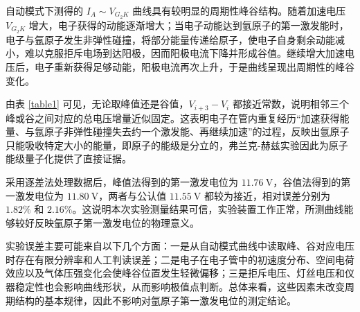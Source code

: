 \documentclass{../template/myrpt}
\begin{document}
自动模式下测得的 $I_A \sim V_{G_2K}$ 曲线具有较明显的周期性峰谷结构。随着加速电压 $V_{G_2K}$ 增大，电子获得的动能逐渐增大；当电子动能达到氩原子的第一激发能时，电子与氩原子发生非弹性碰撞，将部分能量传递给原子，使电子自身剩余动能减小，难以克服拒斥电场到达阳极，因而阳极电流下降并形成谷值。继续增大加速电压后，电子重新获得足够动能，阳极电流再次上升，于是曲线呈现出周期性的峰谷变化。

由表 \ref{table1} 可见，无论取峰值还是谷值，$V_{i+3}-V_i$ 都接近常数，说明相邻三个峰或谷之间对应的总电压增量近似固定。这表明电子在管内重复经历“加速获得能量、与氩原子非弹性碰撞失去约一个激发能、再继续加速”的过程，反映出氩原子只能吸收特定大小的能量，即原子的能级是分立的，弗兰克-赫兹实验因此为原子能级量子化提供了直接证据。

采用逐差法处理数据后，峰值法得到的第一激发电位为 $11.76\ \text{V}$，谷值法得到的第一激发电位为 $11.80\ \text{V}$，两者与公认值 $11.55\ \text{V}$ 都较为接近，相对误差分别为 $1.82\%$ 和 $2.16\%$。这说明本次实验测量结果可信，实验装置工作正常，所测曲线能够较好反映氩原子第一激发电位的物理意义。

实验误差主要可能来自以下几个方面：一是从自动模式曲线中读取峰、谷对应电压时存在有限分辨率和人工判读误差；二是电子在电子管中的初速度分布、空间电荷效应以及气体压强变化会使峰谷位置发生轻微偏移；三是拒斥电压、灯丝电压和仪器稳定性也会影响曲线形状，从而影响极值点判断。总体来看，这些因素未改变周期结构的基本规律，因此不影响对氩原子第一激发电位的测定结论。

\insertSignedDataPage
\end{document}
